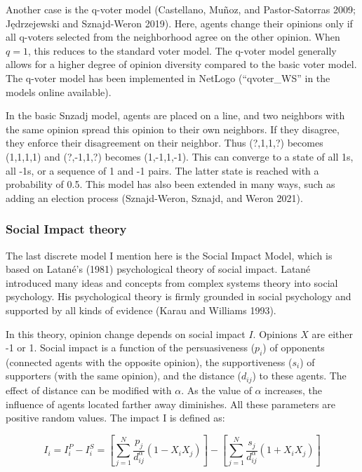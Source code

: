 \documentclass[
  letterpaper,
]{scrbook}
\begin{document}
Another case is the q-voter model (Castellano, Muñoz, and
Pastor-Satorras 2009; Jędrzejewski and Sznajd-Weron 2019). Here, agents
change their opinions only if all q-voters selected from the
neighborhood agree on the other opinion. When \(q = 1\), this reduces to
the standard voter model. The q-voter model generally allows for a
higher degree of opinion diversity compared to the basic voter model.
The q-voter model has been implemented in NetLogo (``qvoter\_WS'' in the
models online available).

In the basic Snzadj model, agents are placed on a line, and two
neighbors with the same opinion spread this opinion to their own
neighbors. If they disagree, they enforce their disagreement on their
neighbor. Thus (?,1,1,?) becomes (1,1,1,1) and (?,-1,1,?) becomes
(1,-1,1,-1). This can converge to a state of all 1s, all -1s, or a
sequence of 1 and -1 pairs. The latter state is reached with a
probability of 0.5. This model has also been extended in many ways, such
as adding an election process (Sznajd-Weron, Sznajd, and Weron 2021).

\hypertarget{social-impact-theory}{%
\subsubsection{Social Impact theory}\label{social-impact-theory}}

The last discrete model I mention here is the Social Impact Model, which
is based on Latané's (1981) psychological theory of social impact.
Latané introduced many ideas and concepts from complex systems theory
into social psychology. His psychological theory is firmly grounded in
social psychology and supported by all kinds of evidence (Karau and
Williams 1993).

In this theory, opinion change depends on social impact \(I\). Opinions
\(X\) are either -1 or 1. Social impact is a function of the
persuasiveness (\(p_{i}\)) of opponents (connected agents with the
opposite opinion), the supportiveness (\(s_{i}\)) of supporters (with
the same opinion), and the distance (\(d_{ij}\)) to these agents. The
effect of distance can be modified with \(\alpha\). As the value of
\(\alpha\) increases, the influence of agents located farther away
diminishes. All these parameters are positive random values. The impact
I is defined as:

\[I_{i} = I_{i}^{P} - I_{i}^{S} = \left\lbrack \sum_{j = 1}^{N}{\frac{p_{j}}{d_{ij}^{\alpha}}\left( 1 - X_{i}X_{j} \right)} \right\rbrack - \left\lbrack \sum_{j = 1}^{N}{\frac{s_{j}}{d_{ij}^{\alpha}}\left( 1 + X_{i}X_{j} \right)} \right\rbrack\]
\end{document}
